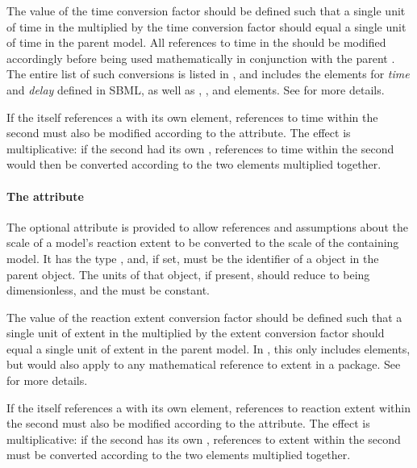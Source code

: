 The value of the time conversion factor should be defined such that a
single unit of time in the \Submodel  multiplied by the time
conversion factor should equal a single unit of time in the parent model.
All references to time in the \Submodel should be modified accordingly
before being used mathematically in conjunction with the parent \Model.
The entire list of such \sbmlthreecore conversions is listed in
, and includes the  elements for
\emph{time} and \emph{delay} defined in SBML, as well as \Delay,
\RateRule, and \KineticLaw elements.  See  for
more details.

If the \Submodel itself references a \Model with its own \Submodel element,
references to time within the second \Submodel must also be modified according
to the  attribute.  The effect is multiplicative:
if the second \Submodel had its own ,  references
to time within the second \Submodel would then be converted according to the
two  elements multiplied together.


\paragraph{The \fixttspace{} attribute}
\label{submodel-extentconversionfactor}

The optional  attribute is provided to
allow references and assumptions about the scale of a model's reaction
extent to be converted to the scale of the containing model.  It has the
type , and, if set, must be the identifier of
a \Parameter object in the parent \Model object.  The units of
that \Parameter object, if present, should reduce to being
dimensionless, and the \Parameter must be constant.

The value of the reaction extent conversion factor should be defined
such that a single unit of extent in the \Submodel multiplied by the
extent conversion factor should equal a single unit of extent in the
parent model.  In \sbmlthreecore, this only includes \KineticLaw
elements, but would also apply to any mathematical reference to extent
in a package. See  for more details.

If the \Submodel itself references a \Model with its own \Submodel
element, references to reaction extent within the second \Submodel must
also be modified according to the 
attribute.  The effect is multiplicative: if the second \Submodel has
its own , references to extent within the
second \Submodel must be converted according to the two
 elements multiplied together.


